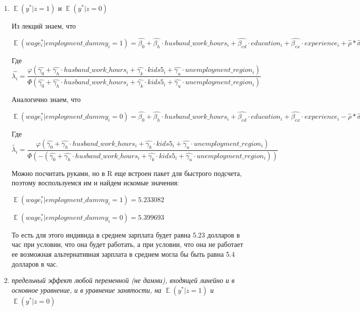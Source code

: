 \documentclass[a4paper,12pt]{article}
\DeclareMathOperator{\EX}{\mathbb{E}}%
\begin{document}
 
 \begin{enumerate}[label=\Alph*)]
 	\item $\EX( y^* | z = 1)$ и $\EX( y^* | z = 0)$
 	
 	Из лекций знаем, что
 	
 	$\EX(wage_i^*|employment\_dummy_i = 1) = \hat{\beta_0}+ \hat{\beta_h} \cdot husband\_work\_hours_i  +\hat{\beta_{ed}} \cdot education_i + \hat{\beta_{ex}}\cdot experience_i +\hat{ \rho }* \hat{\sigma}*\hat{\lambda_i}
 	$
 	
 	Где $\hat{\lambda_i }= \dfrac{\varphi(\hat{\gamma_0}+ \hat{\gamma_h} \cdot husband\_work\_hours_i  + \hat{\gamma_k} \cdot kids5_i +  \hat{\gamma_u} \cdot unemployment\_region_i   )}{\Phi (\hat{\gamma_0}+  \hat{\gamma_h} \cdot husband\_work\_hours_i  + \hat{\gamma_k} \cdot kids5_i +  \hat{\gamma_u} \cdot unemployment\_region_i  )}$
 	
 	Аналогично знаем, что 
 	
 	$\EX(wage_i^*|employment\_dummy_i = 0) = \hat{\beta_0}+ \hat{\beta_h} \cdot husband\_work\_hours_i  +\hat{\beta_{ed}} \cdot education_i + \hat{\beta_{ex}}\cdot experience_i - \hat{ \rho }* \hat{\sigma}*\tilde{\lambda_i}
 	$
 	
 	Где $\tilde{\lambda_i }= \dfrac{\varphi(\hat{\gamma_0}+ \hat{\gamma_h} \cdot husband\_work\_hours_i  + \hat{\gamma_k} \cdot kids5_i +  \hat{\gamma_u} \cdot unemployment\_region_i   )}{\Phi (-(\hat{\gamma_0}+  \hat{\gamma_h} \cdot husband\_work\_hours_i  + \hat{\gamma_k} \cdot kids5_i +  \hat{\gamma_u} \cdot unemployment\_region_i ) )}$
 	
 	Можно посчитать руками, но в R еще встроен пакет для быстрого подсчета, поэтому воспользуемся им и найдем искомые значения:
 	
 	$\EX(wage_i^*|employment\_dummy_i = 1) = 5.233082$
 	
 	$\EX(wage_i^*|employment\_dummy_i = 0) = 5.399693$
 	
 	 То есть для этого индивида в среднем зарплата будет равна 5.23 долларов в час при условии, что она будет работать, а при условии, что она не работает ее возможная альтернативная зарплата в среднем могла бы быть равна 5.4 долларов в час.
 	 
 	\item \textit{предельный эффект любой переменной (не дамми), входящей линейно и в
 		основное уравнение, и в уравнение занятости, на $\EX( y^* | z = 1)$ и $\EX( y^* | z = 0)$}
 	
 	\vspace{0.2cm}
 	

\end{enumerate}
\end{document}
